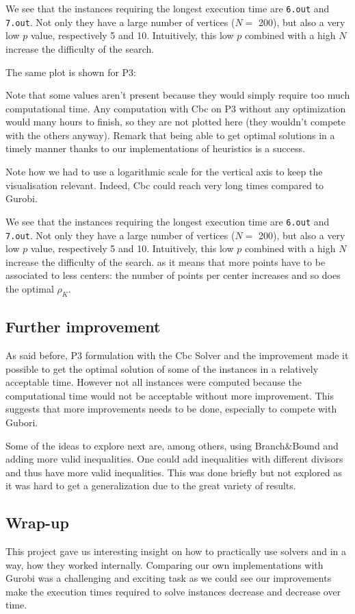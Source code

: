 \documentclass[a4paper,10pt]{article}
\begin{document}
We see that the instances requiring the longest execution time are \texttt{6.out} and \texttt{7.out}. Not only they have a large number of vertices ($N = $ 200), but also a very low $p$ value, respectively 5 and 10. Intuitively, this low $p$ combined with a high $N$ increase the difficulty of the search.

The same plot is shown for P3:

Note that some values aren't present because they would simply require too much computational time. Any computation with Cbc on P3 without any optimization would many hours to finish, so they are not plotted here (they wouldn't compete with the others anyway). Remark that being able to get optimal solutions in a timely manner thanks to our implementations of heuristics is a success.



    Note how we had to use a logarithmic scale for the vertical axis to keep the visualisation relevant. Indeed, Cbc could reach very long times compared to Gurobi.

    We see that the instances requiring the longest execution time are \texttt{6.out} and \texttt{7.out}. Not only they have a large number of vertices ($N = $ 200), but also a very low $p$ value, respectively 5 and 10. Intuitively, this low $p$ combined with a high $N$ increase the difficulty of the search. as it means that more points have to be associated to less centers: the number of points per center increases and so does the optimal $\rho_K$.
    
    
    \subsection{Further improvement}
    
    As said before, P3 formulation with the Cbc Solver and the improvement made it possible to get the optimal solution of some of the instances in a relatively acceptable time. However not all instances were computed because the computational time would not be acceptable without more improvement. This suggests that more improvements needs to be done, especially to compete with Gubori.
    
    Some of the ideas to explore next are, among others, using Branch\&Bound and adding more valid inequalities. One could add inequalities with different divisors and thus have more valid inequalities. This was done briefly but not explored as it was hard to get a generalization due to the great variety of results.
	
	\subsection{Wrap-up}
	This project gave us interesting insight on how to practically use solvers  and  in a way, how they worked internally. Comparing our own implementations with Gurobi was a challenging and exciting task as we could see our improvements make the execution times required to solve instances decrease and decrease over time.
	
\end{document}
